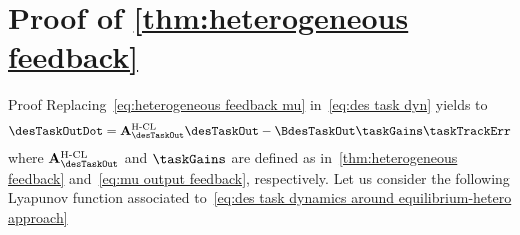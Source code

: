 \section{Proof of \cref{thm:heterogeneous feedback}}\label{proof:thm hetero feedback}
\begin{custumProof}{Proof}
	Replacing~\cref{eq:heterogeneous feedback mu} in~\cref{eq:des task dyn} yields to 
	\begin{align}\label{eq:des task dynamics around equilibrium-hetero approach} 
		\desTaskOutDot = \mathbf{A}^{\text{H-CL}}_\desTaskOut \desTaskOut-\BdesTaskOut \taskGains\taskTrackErr
	\end{align} where $\mathbf{A}^{\text{H-CL}}_\desTaskOut$ and $\taskGains$ are defined as in~\cref{thm:heterogeneous feedback} and~\cref{eq:mu output feedback}, respectively.
	Let us consider the following Lyapunov function associated to~\cref{eq:des task dynamics around equilibrium-hetero approach}

\end{custumProof}
